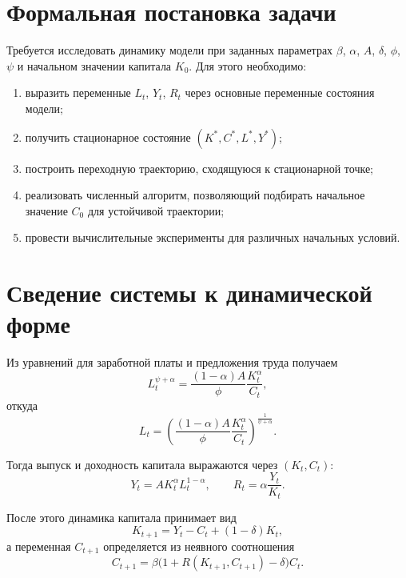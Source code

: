 \documentclass[14pt,a4paper]{extreport}
\begin{document}
    \section{Формальная постановка задачи}

    Требуется исследовать динамику модели при заданных параметрах $\beta$, $\alpha$, $A$, $\delta$, $\phi$, $\psi$ и начальном значении капитала $K_0$. Для этого необходимо:

    \begin{enumerate}[label=\arabic*)]
        \item выразить переменные $L_t$, $Y_t$, $R_t$ через основные переменные состояния модели;
        \item получить стационарное состояние $(K^*,C^*,L^*,Y^*)$;
        \item построить переходную траекторию, сходящуюся к стационарной точке;
        \item реализовать численный алгоритм, позволяющий подбирать начальное значение $C_0$ для устойчивой траектории;
        \item провести вычислительные эксперименты для различных начальных условий.
    \end{enumerate}

    \section{Сведение системы к динамической форме}

    Из уравнений для заработной платы и предложения труда получаем
    \begin{equation}
    L_t^{\psi+\alpha}=\frac{(1-\alpha)A}{\phi}\frac{K_t^{\alpha}}{C_t},
    \end{equation}
    откуда
    \begin{equation}
    L_t=\left(\frac{(1-\alpha)A}{\phi}\frac{K_t^{\alpha}}{C_t}\right)^{\frac{1}{\psi+\alpha}}.
    \end{equation}

    Тогда выпуск и доходность капитала выражаются через $(K_t,C_t)$:
    \begin{equation}
    Y_t=A K_t^{\alpha}L_t^{1-\alpha},
    \qquad
    R_t=\alpha\frac{Y_t}{K_t}.
    \end{equation}

    После этого динамика капитала принимает вид
    \begin{equation}
    K_{t+1}=Y_t-C_t+(1-\delta)K_t,
    \end{equation}
    а переменная $C_{t+1}$ определяется из неявного соотношения
    \begin{equation}
    C_{t+1}=\beta\bigl(1+R(K_{t+1},C_{t+1})-\delta\bigr)C_t.
    \end{equation}
\end{document}
